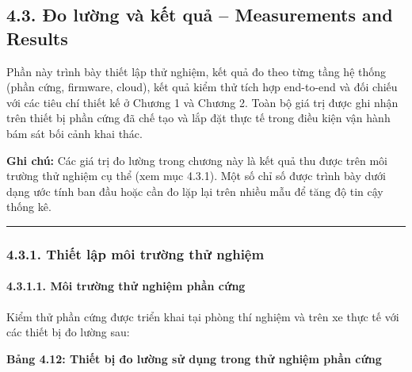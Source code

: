 \documentclass[13pt,a4paper]{extarticle}
\renewcommand{\\}{\thesislongtableorignewline\hline}%
\newcommand{\thesistabletitle}[1]{%
  \begin{center}\textbf{#1}\end{center}%
}
\begin{document}
\subsection{4.3. Đo lường và kết quả -- Measurements and Results}\label{43-ux111o-lux1b0ux1eddng-vuxe0-kux1ebft-quux1ea3--measurements-and-results}

Phần này trình bày thiết lập thử nghiệm, kết quả đo theo từng tầng hệ
thống (phần cứng, firmware, cloud), kết quả kiểm thử tích hợp end-to-end
và đối chiếu với các tiêu chí thiết kế ở Chương 1 và Chương 2. Toàn bộ
giá trị được ghi nhận trên thiết bị phần cứng đã chế tạo và lắp đặt thực
tế trong điều kiện vận hành bám sát bối cảnh khai thác.

\textbf{Ghi chú:} Các giá trị đo lường trong chương này là kết quả thu
được trên môi trường thử nghiệm cụ thể (xem mục 4.3.1). Một số chỉ số
được trình bày dưới dạng ước tính ban đầu hoặc cần đo lặp lại trên nhiều
mẫu để tăng độ tin cậy thống kê.

\begin{center}\rule{0.5\linewidth}{0.5pt}\end{center}

\subsubsection{4.3.1. Thiết lập môi trường thử
nghiệm}\label{431-thiux1ebft-lux1eadp-muxf4i-trux1b0ux1eddng-thux1eed-nghiux1ec7m}

\paragraph{4.3.1.1. Môi trường thử nghiệm phần
cứng}\label{4311-muxf4i-trux1b0ux1eddng-thux1eed-nghiux1ec7m-phux1ea7n-cux1ee9ng}

Kiểm thử phần cứng được triển khai tại phòng thí nghiệm và trên xe thực
tế với các thiết bị đo lường sau:

\thesistabletitle{Bảng 4.12: Thiết bị đo lường sử dụng trong thử nghiệm phần cứng}
\end{document}

